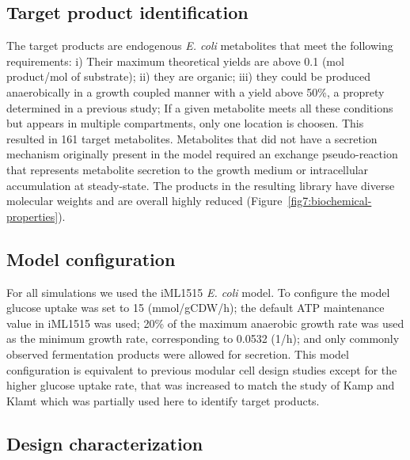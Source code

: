 {\subsection{Target product identification}
The target products are endogenous \textit{E. coli} metabolites that meet the following requirements: i) Their maximum theoretical yields are above 0.1 (mol product/mol of substrate); ii) they are organic; iii) they could be produced anaerobically in a growth coupled manner with a yield above 50\%, a proprety determined in a previous study;\citep{kamp2017}
If a given metabolite meets all these conditions but appears in multiple compartments, only one location is choosen.  %
This resulted in 161 target metabolites.
Metabolites that did not have a secretion mechanism originally present in the model required an exchange pseudo-reaction that represents metabolite secretion to the growth medium or intracellular accumulation at steady-state.
The products in the resulting library have diverse molecular weights and are overall highly reduced %
(Figure~\ref{fig7:biochemical-properties}).

\subsection{Model configuration}
For all simulations we used the iML1515 \textit{E. coli} model.\citep{monk2017}
To configure the model glucose uptake was set to 15 (mmol/gCDW/h); the default ATP maintenance value in iML1515 was used; 20\% of the maximum anaerobic growth rate was used as the minimum growth rate, corresponding to 0.0532 (1/h); and only commonly observed fermentation products were allowed for secretion. This model configuration is equivalent to previous modular cell design studies\citep{garcia2019} except for the higher glucose uptake rate, that was increased to match the study of Kamp and Klamt\citep{kamp2017} which was partially used here to identify target products.

\subsection{Design characterization} \label{sec:design_characterization}
}
